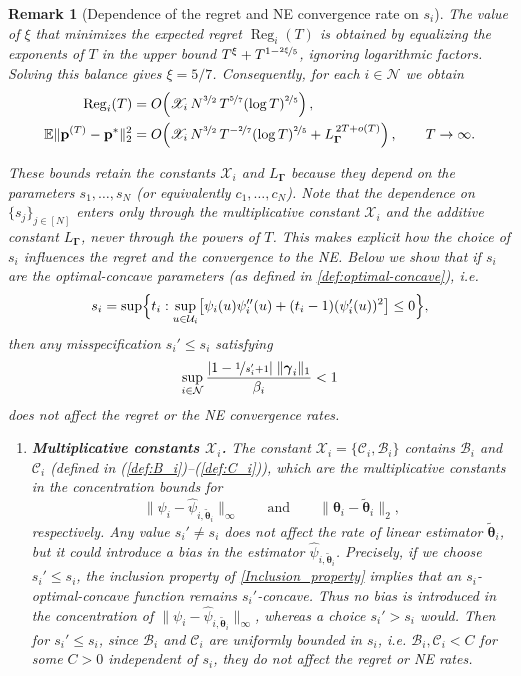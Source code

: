 \documentclass{article} %
\def\eqref#1{equation~\ref{#1}}
\renewcommand{\eqref}[1]{(\ref{#1})}
\newtheorem{remark}[theorem]{Remark}
\begin{document}
\begin{remark}[Dependence of the regret and NE convergence rate on $s_i$]\label{remark:s_-dependece-regret}
The value of $\xi$ that minimizes the expected regret $\operatorname{Reg}_i(T)$ is obtained by equalizing the exponents of $T$ in the upper bound $T^{\xi} + T^{1-\nicefrac{2\xi}{5}}$, ignoring logarithmic factors. Solving this balance gives $\xi = 5/7$. Consequently, for each $i \in \mathcal{N}$ we obtain
\begin{align*}
\operatorname{Reg}_i(T) &= O\!\left(\mathscr{X}_i\, N^{\nicefrac{3}{2}}\,T^{\nicefrac{5}{7}}(\log T)^{\nicefrac{2}{5}}\right), \\
\mathbb{E}\|\mathbf{p}^{(T)}-\mathbf{p}^*\|_2^2 &= 
O\!\left(\mathscr{X}_i\, N^{\nicefrac{3}{2}}\,T^{-\nicefrac{2}{7}}(\log T)^{\nicefrac{2}{5}}
+ L_{\boldsymbol{\Gamma}}^{\,2T+o(T)} \right), \qquad T \to \infty.
\end{align*}

These bounds retain the constants $\mathscr{X}_i$ and $L_{\boldsymbol{\Gamma}}$ because they depend on the parameters $s_1,\dots,s_N$ (or equivalently $c_1,\dots,c_N$). Note that the dependence on $\{s_j\}_{j\in[N]}$ enters only through the multiplicative constant $\mathscr{X}_i$ and the additive constant $L_{\boldsymbol{\Gamma}}$, never through the powers of $T$. This makes explicit how the choice of $s_i$ influences the regret and the convergence to the NE. Below we show that if $s_i$ are the optimal-concave parameters (as defined in \cref{def:optimal-concave}), i.e.
\[
s_i = \sup\Bigl\{t_i:\sup_{u \in \mathcal{U}_i}\bigl[\psi_i(u) \psi_i''(u) +(t_i-1)(\psi_i'(u))^2\bigr] \leq 0\Bigr\},
\]
then any misspecification $s_i' \leq s_i$ satisfying
\[
\sup_{i\in\mathcal{N}}
\frac{|1-\nicefrac{1}{s_i'+1}|\;\|\boldsymbol{\gamma}_i\|_1}{\beta_i} < 1
\]
does not affect the regret or the NE convergence \emph{rates}.

\begin{enumerate}[leftmargin=*, label=(\arabic*)]
\item \textbf{Multiplicative constants $\mathscr{X}_i$.}  
The constant $\mathscr{X}_i = \{\mathscr{C}_i,\mathscr{B}_i\}$ contains $\mathscr{B}_i$ and $\mathscr{C}_i$ (defined in \eqref{def:B_i}--\eqref{def:C_i}), which are the multiplicative constants in the concentration bounds for 
\[
\|\psi_i-\widehat{\psi}_{i, \widetilde{\boldsymbol{\theta}}_i}\|_{\infty}
\qquad\text{and}\qquad
\|\boldsymbol{\theta}_i-\widetilde{\boldsymbol{\theta}}_i\|_{2},
\]
respectively. Any value $s_i' \neq s_i$ does not affect the rate of linear estimator $\widetilde{\boldsymbol{\theta}}_i$, but it could introduce a bias in the estimator $\widehat{\psi}_{i, \widetilde{\boldsymbol{\theta}}_i}$. Precisely, if we choose $s_i' \le s_i$, the inclusion property of \cref{Inclusion_property} implies that an $s_i$-optimal-concave function remains $s_i'$-concave. Thus no bias is introduced in the concentration of $\|\psi_i-\widehat{\psi}_{i, \widetilde{\boldsymbol{\theta}}_i}\|_{\infty}$, whereas a choice $s_i' > s_i$ would. Then for $s_i'\leq s_i$, since $\mathscr{B}_i$ and $\mathscr{C}_i$ are uniformly bounded in $s_i$, i.e. $\mathscr{B}_i,\mathscr{C}_i < C$ for some $C>0$ independent of $s_i$, they do not affect the regret or NE \emph{rates}.


\end{enumerate}
\end{remark}
\end{document}
